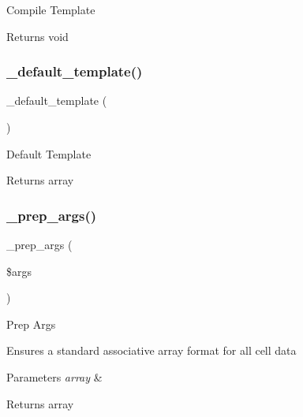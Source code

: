 Compile Template

\begin{DoxyReturn}{Returns}
void 
\end{DoxyReturn}
\mbox{\label{class_c_i___table_ae1990fcb9ffc455614eeac9a1091f0b0}} 
\subsubsection{\texorpdfstring{\+\_\+default\+\_\+template()}{\_default\_template()}}
{\footnotesize\ttfamily \+\_\+default\+\_\+template (\begin{DoxyParamCaption}{ }\end{DoxyParamCaption})\hspace{0.3cm}{\ttfamily [protected]}}

Default Template

\begin{DoxyReturn}{Returns}
array 
\end{DoxyReturn}
\mbox{\label{class_c_i___table_aec91c20b757a8a063e4147f0aebe8b1b}} 
\subsubsection{\texorpdfstring{\+\_\+prep\+\_\+args()}{\_prep\_args()}}
{\footnotesize\ttfamily \+\_\+prep\+\_\+args (\begin{DoxyParamCaption}\item[{}]{\$args }\end{DoxyParamCaption})\hspace{0.3cm}{\ttfamily [protected]}}

Prep Args

Ensures a standard associative array format for all cell data


\begin{DoxyParams}{Parameters}
{\em array} & \\
\hline
\end{DoxyParams}
\begin{DoxyReturn}{Returns}
array 
\end{DoxyReturn}
\mbox{\label{class_c_i___table_a79c6ca8fd1f4e5b4bee157209e866a02}} 
